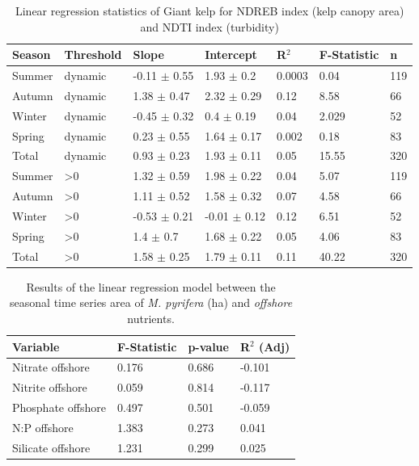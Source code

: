 \documentclass[a4paper,fleqn]{cas-sc}
\begin{document}
\begin{table}[width=.9\linewidth,cols=6,pos=h]
\caption{Linear regression statistics of Giant kelp for NDREB index (kelp canopy area) and NDTI index (turbidity)}\label{S5}
\small
\begin{tabular*}{\tblwidth}{@{} LLLLLLL@{} }
\toprule
Season & Threshold &Slope & Intercept & R$^{2}$ & F-Statistic & n\\
\midrule
Summer  & dynamic & -0.11 $\pm$ 0.55 & 1.93 $\pm$ 0.2 & 0.0003 & 0.04 & 119 \\
Autumn  & dynamic & 1.38 $\pm$ 0.47 & 2.32 $\pm$ 0.29 & 0.12 & 8.58 & 66 \\
Winter  & dynamic & -0.45 $\pm$ 0.32 & 0.4 $\pm$ 0.19 & 0.04 & 2.029 & 52 \\
Spring  & dynamic & 0.23 $\pm$ 0.55 & 1.64 $\pm$ 0.17 & 0.002 & 0.18 & 83 \\
Total  & dynamic & 0.93 $\pm$ 0.23 & 1.93 $\pm$ 0.11 & 0.05 & 15.55 & 320 \\
Summer  & >0 & 1.32 $\pm$ 0.59 & 1.98 $\pm$ 0.22 & 0.04 & 5.07 & 119 \\
Autumn  & >0 & 1.11 $\pm$ 0.52 & 1.58 $\pm$ 0.32 & 0.07 & 4.58 & 66 \\
Winter  & >0 & -0.53 $\pm$ 0.21 & -0.01 $\pm$ 0.12 & 0.12 & 6.51 & 52 \\
Spring  & >0 & 1.4 $\pm$ 0.7 & 1.68 $\pm$ 0.22 & 0.05 & 4.06 & 83 \\
Total  & >0 & 1.58 $\pm$ 0.25 & 1.79 $\pm$ 0.11 & 0.11 & 40.22 & 320 \\\bottomrule
\end{tabular*}
\label{Fig:NDREBTurbidity}
\end{table}
\FloatBarrier

\begin{table}[width=.9\linewidth,cols=4,pos=h]
\caption{Results of the linear regression model between the seasonal time series area of \textit{M. pyrifera} (ha) and \textit{offshore} nutrients.}\label{nutrientoff}
\small
\begin{tabular*}{\tblwidth}{@{} LLLL@{} }
\toprule
Variable & F-Statistic & p-value & R$^{2}$ (Adj) \\
\midrule
Nitrate offshore & 0.176 & 0.686 & -0.101 \\
Nitrite offshore & 0.059 & 0.814 & -0.117 \\
Phosphate offshore & 0.497 & 0.501 & -0.059 \\
N:P offshore & 1.383 & 0.273 & 0.041 \\
Silicate offshore & 1.231 & 0.299 & 0.025 \\
\bottomrule
\end{tabular*}
\end{table}
\FloatBarrier
\end{document}
